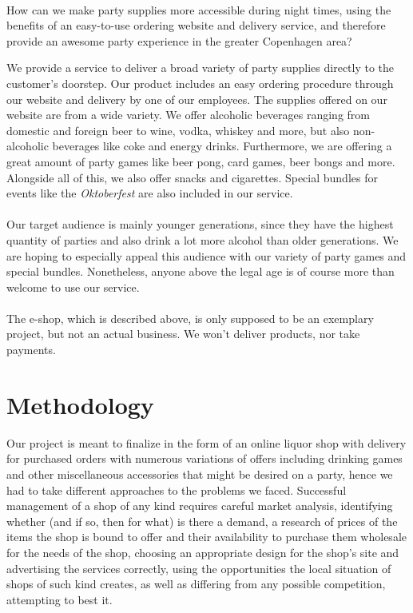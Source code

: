 \documentclass[12p]{article}
\begin{document}
\begin{center}
    \vspace{1em}
    \SlimHRule\\[0.1cm]
    \Large{How can we make party supplies more accessible during night times, using the benefits of an easy-to-use ordering website and delivery service, and therefore provide an awesome party experience in the greater Copenhagen area?}
    \SlimHRule\\[0.1cm]
    \vspace{1em}
\end{center}

We provide a service to deliver a broad variety of party supplies directly to the customer's doorstep. Our product includes an easy ordering procedure through our website and delivery by one of our employees. The supplies offered on our website are from a wide variety. We offer alcoholic beverages ranging from domestic and foreign beer to wine, vodka, whiskey and more, but also non-alcoholic beverages like coke and energy drinks. Furthermore, we are offering a great amount of party games like beer pong, card games, beer bongs and more. Alongside all of this, we also offer snacks and cigarettes. Special bundles for events like the \emph{Oktoberfest} are also included in our service.
\\ \\
Our target audience is mainly younger generations, since they have the highest quantity of parties and also drink a lot more alcohol than older generations. We are hoping to especially appeal this audience with our variety of party games and special bundles. Nonetheless, anyone above the legal age is of course more than welcome to use our service.
\\ \\
The e-shop, which is described above, is only supposed to be an exemplary project, but not an actual business. We won't deliver products, nor take payments.


\newpage
\section{Methodology} \label{Methodology}
Our project is meant to finalize in the form of an online liquor shop with delivery for purchased orders with numerous variations of offers including drinking games and other miscellaneous accessories that might be desired on a party, hence we had to take different approaches to the problems we faced. Successful management of a shop of any kind requires careful market analysis, identifying whether (and if so, then for what) is there a demand, a research of prices of the items the shop is bound to offer and their availability to purchase them wholesale for the needs of the shop, choosing an appropriate design for the shop’s site and advertising the services correctly, using the opportunities the local situation of shops of such kind creates, as well as differing from any possible competition, attempting to best it. 
\end{document}
